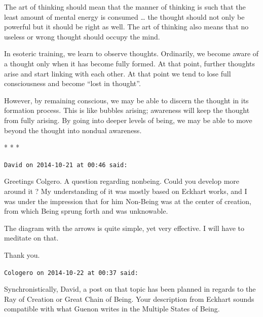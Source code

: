 \begin{quotex}
The art of thinking should mean that the manner of thinking is such that the least amount of mental energy is consumed … the thought should not only be powerful but it should be right as well. The art of thinking also means that no useless or wrong thought should occupy the mind. 

\end{quotex}
In esoteric training, we learn to observe thoughts. Ordinarily, we become aware of a thought only when it has become fully formed. At that point, further thoughts arise and start linking with each other. At that point we tend to lose full consciousness and become “lost in thought”.

However, by remaining conscious, we may be able to discern the thought in its formation process. This is like bubbles arising; awareness will keep the thought from fully arising. By going into deeper levels of being, we may be able to move beyond the thought into nondual awareness.


\hfill


\begin{center}* * *\end{center}

\begin{footnotesize}\begin{sffamily}

\texttt{David on 2014-10-21 at 00:46 said: }

Greetings Colgero. A question regarding nonbeing. Could you develop more around it ? My understanding of it was mostly based on Eckhart works, and I was under the impression that for him Non-Being was at the center of creation, from which Being sprung forth and was unknowable. 

The diagram with the arrows is quite simple, yet very effective. I will have to meditate on that. 

Thank you.


\hfill

\texttt{Cologero on 2014-10-22 at 00:37 said: }

Synchronistically, David, a post on that topic has been planned in regards to the Ray of Creation or Great Chain of Being. Your description from Eckhart sounds compatible with what Guenon writes in the Multiple States of Being.


\end{sffamily}\end{footnotesize}
